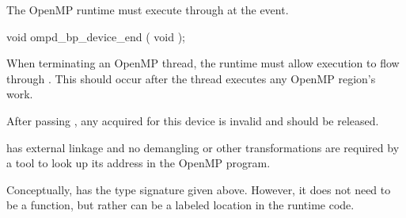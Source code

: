 \summary
The OpenMP runtime must execute through
 at the  event.


\begin{cspecific}
\begin{ompSyntax}
void ompd_bp_device_end ( void );
\end{ompSyntax}
\end{cspecific}


\descr

When terminating an OpenMP thread, the runtime must allow execution
to flow through .
This should occur after the thread executes any OpenMP region's work.

After passing , any  acquired for this
device is invalid and should be released.

\restrictions

 has external  linkage and no
demangling or other transformations are required by a tool
to look up its address in the OpenMP program.

Conceptually,  has the type signature
given above.
However, it does not need to be a function, but rather can be a labeled location
in the runtime code.


